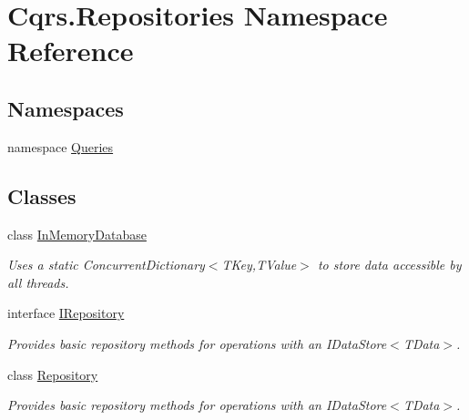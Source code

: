 \hypertarget{namespaceCqrs_1_1Repositories}{}\section{Cqrs.\+Repositories Namespace Reference}
\label{namespaceCqrs_1_1Repositories}
\subsection*{Namespaces}
\begin{DoxyCompactItemize}
\item 
namespace \hyperlink{namespaceCqrs_1_1Repositories_1_1Queries}{Queries}
\end{DoxyCompactItemize}
\subsection*{Classes}
\begin{DoxyCompactItemize}
\item 
class \hyperlink{classCqrs_1_1Repositories_1_1InMemoryDatabase}{In\+Memory\+Database}
\begin{DoxyCompactList}\small\item\em Uses a static Concurrent\+Dictionary$<$\+T\+Key,\+T\+Value$>$ to store data accessible by all threads. \end{DoxyCompactList}\item 
interface \hyperlink{interfaceCqrs_1_1Repositories_1_1IRepository}{I\+Repository}
\begin{DoxyCompactList}\small\item\em Provides basic repository methods for operations with an I\+Data\+Store$<$\+T\+Data$>$. \end{DoxyCompactList}\item 
class \hyperlink{classCqrs_1_1Repositories_1_1Repository}{Repository}
\begin{DoxyCompactList}\small\item\em Provides basic repository methods for operations with an I\+Data\+Store$<$\+T\+Data$>$. \end{DoxyCompactList}\end{DoxyCompactItemize}
